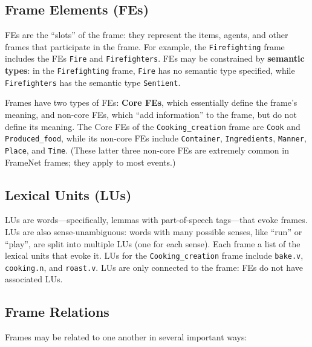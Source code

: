 \subsection{Frame Elements (FEs)}
FEs are the ``slots'' of the frame: they represent the items, agents, and other frames that participate in the frame. For example, the \texttt{Firefighting} frame includes the FEs \texttt{Fire} and \texttt{Firefighters}. FEs may be constrained by \textbf{semantic types}: in the \texttt{Firefighting} frame, \texttt{Fire} has no semantic type specified, while \texttt{Firefighters} has the semantic type \texttt{Sentient}.

Frames have two types of FEs: \textbf{Core FEs}, which essentially define the frame's meaning, and non-core FEs, which ``add information'' to the frame, but do not define its meaning. The Core FEs of the \texttt{Cooking\_creation} frame are \texttt{Cook} and \texttt{Produced\_food}, while its non-core FEs include \texttt{Container}, \texttt{Ingredients}, \texttt{Manner}, \texttt{Place}, and \texttt{Time}. (These latter three non-core FEs are extremely common in FrameNet frames; they apply to most events.)

\subsection{Lexical Units (LUs)}
LUs are words---specifically, lemmas with part-of-speech tags---that evoke frames. LUs are also sense-unambiguous: words with many possible senses, like ``run'' or ``play'', are split into multiple LUs (one for each sense). Each frame a list of the lexical units that evoke it. LUs for the \texttt{Cooking\_creation} frame include \texttt{bake.v}, \texttt{cooking.n}, and \texttt{roast.v}. LUs are only connected to the frame: FEs do not have associated LUs.

\subsection{Frame Relations}
Frames may be related to one another in several important ways:

